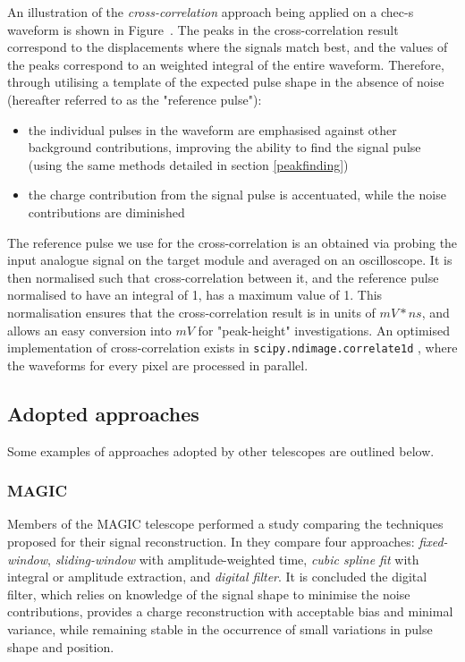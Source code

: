 An illustration of the \textit{cross-correlation} approach being applied on a \gls{chec-s} waveform is shown in Figure~. The peaks in the cross-correlation result correspond to the displacements where the signals match best, and the values of the peaks correspond to an weighted integral of the entire waveform. Therefore, through utilising a template of the expected pulse shape in the absence of noise (hereafter referred to as the "reference pulse"):
\begin{itemize}
	\item the individual pulses in the waveform are emphasised against other background contributions, improving the ability to find the signal pulse (using the same methods detailed in section \ref{peakfinding})
	\item the charge contribution from the signal pulse is accentuated, while the noise contributions are diminished
\end{itemize}
The reference pulse we use for the cross-correlation is an obtained via probing the input analogue signal on the \gls{target} module and averaged on an oscilloscope. It is then normalised such that cross-correlation between it, and the reference pulse normalised to have an integral of 1, has a maximum value of 1. This normalisation ensures that the cross-correlation result is in units of $mV*ns$, and allows an easy conversion into $mV$ for "peak-height" investigations.  An optimised implementation of cross-correlation exists in \lstinline{scipy.ndimage.correlate1d} \cite{scipy-crosscorrelate}, where the waveforms for every pixel are processed in parallel.

\subsection{Adopted approaches}

Some examples of approaches adopted by other telescopes are outlined below.

\subsubsection{MAGIC}

Members of the MAGIC telescope performed a study comparing the techniques proposed for their signal reconstruction. In \cite{Albert2008} they compare four approaches: \textit{fixed-window}, \textit{sliding-window} with amplitude-weighted time, \textit{cubic spline fit} with integral or amplitude extraction, and \textit{digital filter}. It is concluded the digital filter, which relies on knowledge of the signal shape to minimise the noise contributions, provides a charge reconstruction with acceptable bias and minimal variance, while remaining stable in the occurrence of small variations in pulse shape and position.

